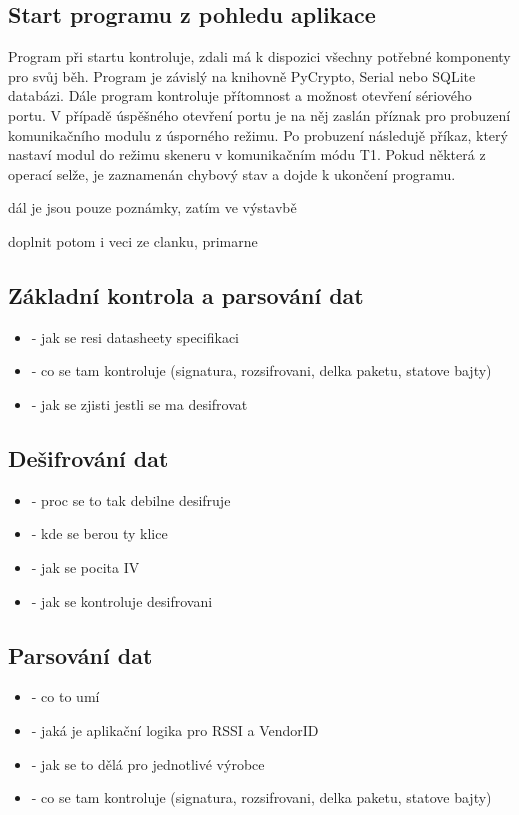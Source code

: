 \subsection{Start programu z pohledu aplikace}
Program při startu kontroluje, zdali  má k dispozici všechny potřebné komponenty pro svůj běh. Program je závislý na knihovně PyCrypto, Serial nebo SQLite databázi.
Dále program kontroluje přítomnost a možnost otevření sériového portu. V případě úspěšného otevření portu je na něj zaslán příznak pro probuzení komunikačního modulu z úsporného režimu. Po probuzení následujě příkaz, který nastaví modul do režimu skeneru v komunikačním módu T1. Pokud některá z operací selže, je zaznamenán chybový stav a dojde k ukončení programu.

\colorbox[rgb]{0,1,0}{dál je jsou pouze poznámky, zatím ve výstavbě}

\colorbox[rgb]{0,1,0}{doplnit potom i veci ze clanku, primarne}

\subsection{Základní kontrola a parsování dat}
\begin{itemize}
\item - jak se resi datasheety specifikaci
\item - co se tam kontroluje (signatura, rozsifrovani, delka paketu, statove bajty)
\item - jak se zjisti jestli se ma desifrovat
\end{itemize}

\subsection{Dešifrování dat}
\begin{itemize}
\item - proc se to tak debilne desifruje
\item - kde se berou ty klice
\item - jak se pocita IV
\item - jak se kontroluje desifrovani
\end{itemize}

\subsection{Parsování dat}
\begin{itemize}
\item - co to umí
\item - jaká je aplikační logika pro RSSI a VendorID
\item - jak se to dělá pro jednotlivé výrobce
\item - co se tam kontroluje (signatura, rozsifrovani, delka paketu, statove bajty)
\end{itemize}

